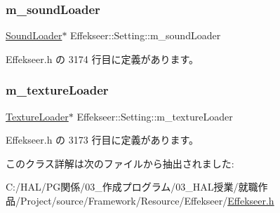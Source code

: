 \mbox{\label{class_effekseer_1_1_setting_a1da02ce0c370b60c2fa5a0d76e85eeb6}} 
\subsubsection{\texorpdfstring{m\+\_\+sound\+Loader}{m\_soundLoader}}
{\footnotesize\ttfamily \mbox{\hyperlink{class_effekseer_1_1_sound_loader}{Sound\+Loader}}$\ast$ Effekseer\+::\+Setting\+::m\+\_\+sound\+Loader\hspace{0.3cm}{\ttfamily [private]}}



 Effekseer.\+h の 3174 行目に定義があります。

\mbox{\label{class_effekseer_1_1_setting_a05cf55c34e1d640e2080f15b3478ea0b}} 
\subsubsection{\texorpdfstring{m\+\_\+texture\+Loader}{m\_textureLoader}}
{\footnotesize\ttfamily \mbox{\hyperlink{class_effekseer_1_1_texture_loader}{Texture\+Loader}}$\ast$ Effekseer\+::\+Setting\+::m\+\_\+texture\+Loader\hspace{0.3cm}{\ttfamily [private]}}



 Effekseer.\+h の 3173 行目に定義があります。



このクラス詳解は次のファイルから抽出されました\+:\begin{DoxyCompactItemize}
\item 
C\+:/\+H\+A\+L/\+P\+G関係/03\+\_\+作成プログラム/03\+\_\+\+H\+A\+L授業/就職作品/\+Project/source/\+Framework/\+Resource/\+Effekseer/\mbox{\hyperlink{_effekseer_8h}{Effekseer.\+h}}\end{DoxyCompactItemize}
